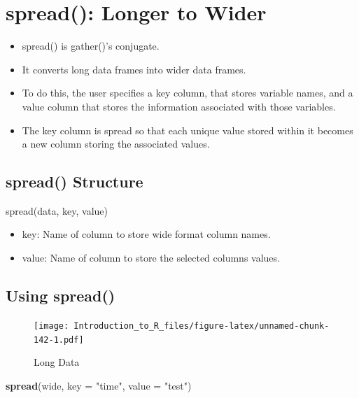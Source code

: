 \documentclass[]{book}
\newenvironment{Shaded}{\begin{snugshade}}{\end{snugshade}}
\newcommand{\DataTypeTok}[1]{\textcolor[rgb]{0.13,0.29,0.53}{#1}}
\newcommand{\KeywordTok}[1]{\textcolor[rgb]{0.13,0.29,0.53}{\textbf{#1}}}
\newcommand{\NormalTok}[1]{#1}
\newcommand{\StringTok}[1]{\textcolor[rgb]{0.31,0.60,0.02}{#1}}
\providecommand{\tightlist}{%
  \setlength{\itemsep}{0pt}\setlength{\parskip}{0pt}}
\theoremstyle{definition}
\theoremstyle{definition}
\theoremstyle{definition}
\theoremstyle{remark}
\let\BeginKnitrBlock\begin \let\EndKnitrBlock\end
\begin{document}
\hypertarget{spread-longer-to-wider}{%
\section{spread(): Longer to Wider}\label{spread-longer-to-wider}}

\begin{itemize}
\tightlist
\item
  spread() is gather()'s conjugate.
\item
  It converts long data frames into wider data frames.
\item
  To do this, the user specifies a key column, that stores variable names, and a value column that stores the information associated with those variables.
\item
  The key column is spread so that each unique value stored within it becomes a new column storing the associated values.
\end{itemize}

\hypertarget{spread-structure}{%
\subsection{spread() Structure}\label{spread-structure}}

spread(data, key, value)

\begin{itemize}
\tightlist
\item
  key: Name of column to store wide format column names.
\item
  value: Name of column to store the selected columns values.
\end{itemize}

\hypertarget{using-spread}{%
\subsection{Using spread()}\label{using-spread}}

\begin{figure}
\centering
\texttt{[image: Introduction\_to\_R\_files/figure-latex/unnamed-chunk-142-1.pdf]}
\caption{\label{fig:unnamed-chunk-142}Long Data}
\end{figure}

\BeginKnitrBlock{example}
\protect\hypertarget{exm:spread1}{}{\label{exm:spread1} }
\EndKnitrBlock{example}

\begin{Shaded}
\begin{Highlighting}[]
\KeywordTok{spread}\NormalTok{(wide, }\DataTypeTok{key =} \StringTok{"time"}\NormalTok{, }\DataTypeTok{value =} \StringTok{"test"}\NormalTok{)}
\end{Highlighting}
\end{Shaded}
\end{document}
